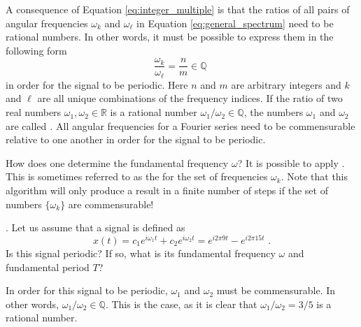 A consequence of Equation \ref{eq:integer_multiple} is that the ratios
of all pairs of angular frequencies $\omega_k$ and $\omega_{\ell}$ in
Equation \ref{eq:general_spectrum} need to be rational numbers. In
other words, it must be possible to express them in the following form
\begin{equation}
  \frac{\omega_k}{\omega_{\ell}} = \frac{n}{m} \in \mathbb{Q} \,\,
\end{equation}
in order for the signal to be periodic. Here $n$ and $m$ are arbitrary
integers and $k$ and $\ell$ are all unique combinations of the
frequency indices.  If the ratio of two real numbers
$\omega_1,\omega_2\in\mathbb{R}$ is a rational number
$\omega_1/\omega_2 \in \mathbb{Q}$, the numbers $\omega_1$ and
$\omega_2$ are called \emph{.}
All angular frequencies for a Fourier series need to be commensurable
relative to one another in order for the signal to be periodic.

How does one determine the fundamental frequency $\omega$? It is
possible to apply \emph{}. This is sometimes referred to as
the \emph{}
for the set of frequencies $\omega_k$. Note that this algorithm will
only produce a result in a finite number of steps if the set of
numbers $\{\omega_k\}$ are commensurable!

. Let us assume that a signal is defined as
\begin{equation}
  x(t) = c_1 e^{i \omega_1 t} + c_2 e^{i \omega_2 t} = e^{i 2\pi 9t} -
  e^{i 2\pi 15t} \,\,.
\end{equation}
Is this signal periodic? If so, what is its fundamental frequency
$\omega$ and fundamental period $T$?

In order for this signal to be periodic, $\omega_1$ and $\omega_2$
must be commensurable.  In other words,
$\omega_1/\omega_2 \in \mathbb{Q}$. This is the case, as it is clear
that $\omega_1/\omega_2 = 3/5$ is a rational number.

